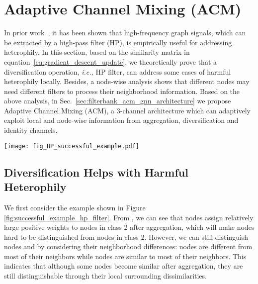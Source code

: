 \documentclass{article}
\newcommand\ie{\textit{i.e.,}}
\newcommand{\0}{{\boldsymbol{0}}}
\newcommand{\6}{{\partial}}
\newcommand{\8}{{\infty}}
\newcommand{\4}{{\nabla}}
\def\eqref#1{equation~\ref{#1}}
\begin{document}
\vspace{-0.3cm}
\section{Adaptive Channel Mixing (ACM)}
\vspace{-0.2cm}
\label{sec:acm_framework}
In prior work~\cite{luan2020complete,chien2021adaptive,bo2021beyond}, it has been shown that
high-frequency graph signals, which can be extracted by a high-pass filter (HP), is empirically useful for addressing heterophily. In this section, based on the similarity matrix in \eqref{eq:gradient_descent_update}, we theoretically prove that a diversification operation, \ie{} HP filter, can address some cases of harmful heterophily locally. Besides, a node-wise analysis shows that different nodes may need different filters to process their neighborhood information. Based on the above analysis, in Sec.~\ref{sec:filterbank_acm_gnn_architecture} we propose Adaptive Channel Mixing (ACM), a 3-channel architecture which can adaptively exploit local and node-wise information from aggregation, diversification and identity channels. \begin{figure*}[t!]
  \begin{center}
    \texttt{[image: fig\_HP\_successful\_example.pdf]}
  \end{center}
  \caption{Example of how diversification can address harmful heterophily}
  \label{fig:successful_example_hp_filter}
\end{figure*}
\iffalse
\begin{figure}[htbp]
\centering
{
\captionsetup{justification = centering}
\texttt{[image: fig\_HP\_successful\_example.pdf]}}
{\caption{Example of how HP filter addresses harmful heterophily}\label{fig:successful_example_hp_filter}
}
\end{figure}
\fi
\vspace{-0.2cm}
\subsection{Diversification Helps with Harmful Heterophily}
\vspace{-0.3cm}
\label{sec:how_diversification_operation_helps}
We first consider the example shown in Figure \ref{fig:successful_example_hp_filter}. From , we can see that nodes  assign relatively large positive weights to nodes in class 2 after aggregation, which will make nodes  hard to be distinguished from nodes in class 2. However, we can still distinguish nodes  and  by considering their neighborhood differences: nodes  are different from most of their neighbors while nodes  are similar to most of their neighbors. This indicates that although some nodes become similar after aggregation, they are still distinguishable through their local surrounding dissimilarities. 
\end{document}
